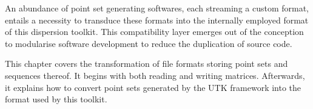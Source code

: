 %
An abundance of point set generating softwares, each streaming a custom format, entails a necessity to transduce these formats into the internally employed format of this dispersion toolkit. This compatibility layer emerges out of the conception to modularise software development to reduce the duplication of source code.

This chapter covers the transformation of file formats storing point sets and sequences thereof. It begins with both reading and writing matrices. Afterwards, it explains how to convert point sets generated by the UTK framework into the format used by this toolkit.

\clearpage
